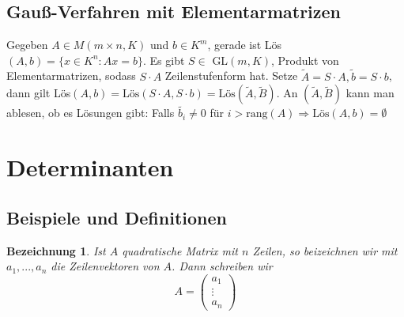\documentclass[12pt,a4paper]{article}
\theoremstyle{plain}
\newtheorem{bez}[Theorem]{Bezeichnung}
\numberwithin{equation}{section}
\begin{document}
\subsection{Gauß-Verfahren mit Elementarmatrizen}
Gegeben $A\in M(m\times n,K)$ und $b\in K^m$, gerade ist Lös$(A,b)=\{x\in K^n:Ax=b\}$. Es gibt $S\in $ GL$(m,K)$, Produkt von Elementarmatrizen, sodass $S\cdot A$ Zeilenstufenform hat. Setze $\tilde{A}=S\cdot A, \tilde{b}=S\cdot b$, dann gilt Lös$(A,b)=\text{Lös}(S\cdot A, S\cdot b)=\text{Lös}(\tilde{A},\tilde{B})$. An $(\tilde{A},\tilde{B})$ kann man ablesen, ob es Lösungen gibt: Falls $\tilde{b_i}\neq 0$ für $i>\text{rang}(A) \Rightarrow \text{Lös}(A,b)=\emptyset$
\section{Determinanten}
\subsection{Beispiele und Definitionen}
\begin{bez}
Ist $A$ quadratische Matrix mit $n$ Zeilen, so beizeichnen wir mit $a_1,...,a_n$ die Zeilenvektoren von $A$. Dann schreiben wir
\[A=\begin{pmatrix} a_1\\\vdots\\a_n\end{pmatrix}\]
\end{bez}
\end{document}
